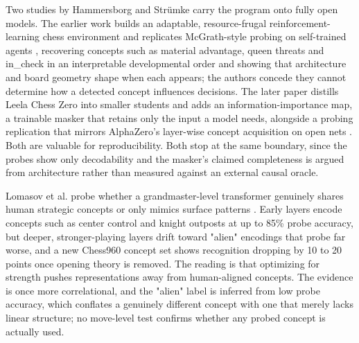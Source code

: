 \documentclass[conference]{IEEEtran}
\begin{document}
Two studies by Hammersborg and Strümke carry the program onto fully open models. The earlier work builds an adaptable, resource-frugal reinforcement-learning chess environment and replicates McGrath-style probing on self-trained agents \cite{ref41}, recovering concepts such as material advantage, queen threats and in\_check in an interpretable developmental order and showing that architecture and board geometry shape when each appears; the authors concede they cannot determine how a detected concept influences decisions. The later paper distills Leela Chess Zero into smaller students and adds an information-importance map, a trainable masker that retains only the input a model needs, alongside a probing replication that mirrors AlphaZero's layer-wise concept acquisition on open nets \cite{ref40}. Both are valuable for reproducibility. Both stop at the same boundary, since the probes show only decodability and the masker's claimed completeness is argued from architecture rather than measured against an external causal oracle.

Lomasov et al. probe whether a grandmaster-level transformer genuinely shares human strategic concepts or only mimics surface patterns \cite{ref43}. Early layers encode concepts such as center control and knight outposts at up to 85\% probe accuracy, but deeper, stronger-playing layers drift toward "alien" encodings that probe far worse, and a new Chess960 concept set shows recognition dropping by 10 to 20 points once opening theory is removed. The reading is that optimizing for strength pushes representations away from human-aligned concepts. The evidence is once more correlational, and the "alien" label is inferred from low probe accuracy, which conflates a genuinely different concept with one that merely lacks linear structure; no move-level test confirms whether any probed concept is actually used.
\end{document}
